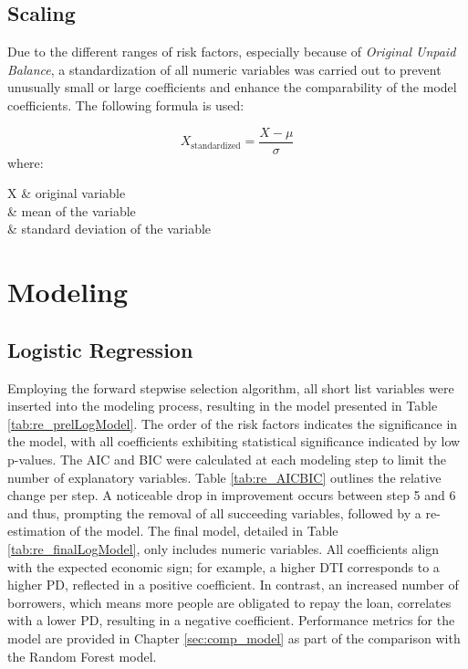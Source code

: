\subsection{Scaling}
Due to the different ranges of risk factors, especially because of \emph{Original Unpaid Balance}, a standardization of all numeric variables was carried out to prevent unusually small or large coefficients and enhance the comparability of the model coefficients. The following formula is used:

\begin{equation}
X_{\text{standardized}} = \frac{X - \mu}{\sigma}
\end{equation}
where:
\begin{conditions}
 X  	& original variable \\
\mu		& mean of the variable \\
\sigma	& standard deviation of the variable
\end{conditions}

\section{Modeling}

\subsection{Logistic Regression}
Employing the forward stepwise selection algorithm, all short list variables were inserted into the modeling process, resulting in the model presented in Table \ref{tab:re_prelLogModel}. The order of the risk factors indicates the significance in the model, with all coefficients exhibiting statistical significance indicated by low p-values. The AIC and BIC were calculated at each modeling step to limit the number of explanatory variables. Table \ref{tab:re_AICBIC} outlines the relative change per step. A noticeable drop in improvement occurs between step 5 and 6 and thus, prompting the removal of all succeeding variables, followed by a re-estimation of the model. The final model, detailed in Table \ref{tab:re_finalLogModel}, only includes numeric variables. All coefficients align with the expected economic sign; for example, a higher DTI corresponds to a higher \acl{PD}, reflected in a positive coefficient. In contrast, an increased number of borrowers, which means more people are obligated to repay the loan, correlates with a lower \acl{PD}, resulting in a negative coefficient. Performance metrics for the model are provided in Chapter \ref{sec:comp_model} as part of the comparison with the Random Forest model.

